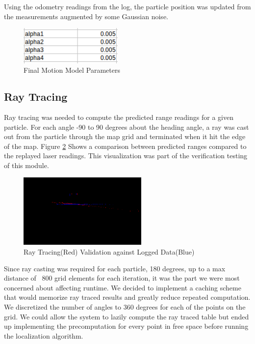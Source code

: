 \documentclass{article}
\begin{document}
Using the odometry readings from the log, the particle position was updated from the measurements augmented by some Gaussian noise. 

\begin{figure}[!h]
    \centering
    \includegraphics[width=2.0in]{media/motion_model_parameters.png}
    \caption{Final Motion Model Parameters}
\label{fig:4}
\end{figure}

\subsection{Ray Tracing}

Ray tracing was needed to compute the predicted range readings for a given particle.  For each angle -90 to 90 degrees about the heading angle, a ray was cast out from the particle through the map grid and terminated when it hit the edge of the map.  Figure \ref{fig:5} Shows a comparison between predicted ranges compared to the replayed laser readings. This visualization was part of the verification testing of this module.

\begin{figure}[!h]
    \centering
    \includegraphics[width=2.5in]{media/ray_tracing.png}
    \caption{Ray Tracing(Red) Validation against Logged Data(Blue)}
\label{fig:5}
\end{figure}

Since ray casting was required for each particle, 180 degrees, up to a max distance of ~800 grid elements for each iteration, it was the part we were most concerned about affecting runtime.  We decided to implement a caching scheme that would memorize ray traced results and greatly reduce repeated computation. We discretized the number of angles to 360 degrees for each of the points on the grid. We could allow the system to lazily compute the ray traced table but ended up implementing the precomputation for every point in free space before running the localization algorithm.   
\end{document}
